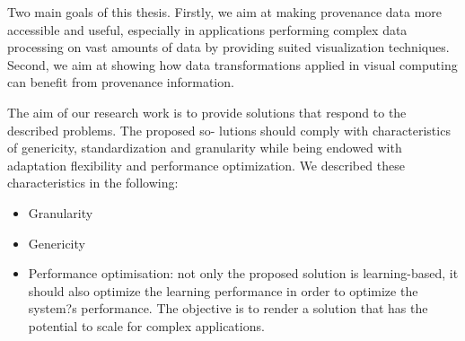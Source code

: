 {\color{Fuchsia}Two main goals of this thesis. Firstly, we aim at making provenance data more accessible and useful, especially in applications performing complex data processing on vast amounts of data by providing suited visualization techniques.
Second, we aim at showing how data transformations applied in visual computing can benefit from provenance information.}	
	
	
	The aim of our research work is to provide solutions that respond to the described problems. The proposed so- lutions should comply with characteristics of genericity, standardization and granularity while being endowed with adaptation flexibility and performance optimization. We described these characteristics in the following:
	\begin{itemize}
\item Granularity
\item Genericity
\item Performance optimisation: not only the proposed solution is learning-based, it should also optimize the learning performance in order to optimize the system?s performance. The objective is to render a solution that has the potential to scale for complex applications.

\end{itemize}